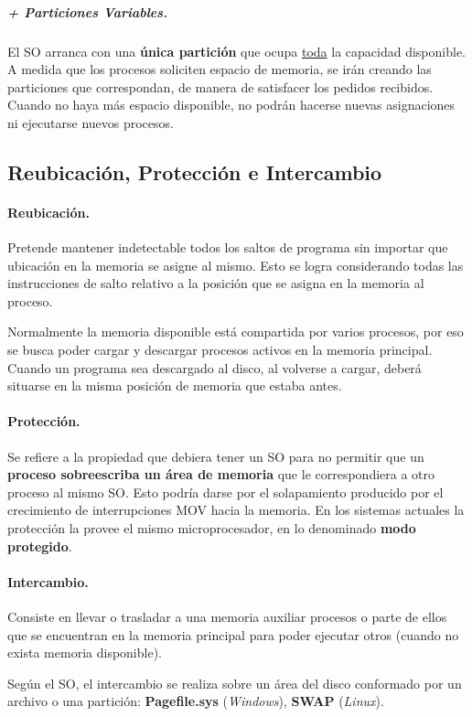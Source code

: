 \documentclass[10pt,a4paper]{article}
\begin{document}
\subparagraph{+ Particiones Variables.} El SO arranca con una \textbf{única partición} que ocupa \underline{toda} la capacidad disponible. A medida que los procesos soliciten espacio de memoria, se irán creando las particiones que correspondan, de manera de satisfacer los pedidos recibidos. Cuando no haya más espacio disponible, no podrán hacerse nuevas asignaciones ni ejecutarse nuevos procesos.

\subsection{Reubicación, Protección e Intercambio}

\paragraph{Reubicación.} Pretende mantener indetectable todos los saltos de programa sin importar que ubicación en la memoria se asigne al mismo. Esto se logra considerando todas las instrucciones de salto relativo a la posición que se asigna en la memoria al proceso.

Normalmente la memoria disponible está compartida por varios procesos, por eso se busca poder cargar y descargar procesos activos en la memoria principal. Cuando un programa sea descargado al disco, al volverse a cargar, deberá situarse en la misma posición de memoria que estaba antes.

\paragraph{Protección.} Se refiere a la propiedad que debiera tener un SO para no permitir que un \textbf{proceso sobreescriba un área de memoria} que le correspondiera a otro proceso al mismo SO. Esto podría darse por el solapamiento producido por el crecimiento de interrupciones MOV hacia la memoria. En los sistemas actuales la protección la provee el mismo microprocesador, en lo denominado \textbf{modo protegido}.

\paragraph{Intercambio.} Consiste en llevar o trasladar a una memoria auxiliar procesos o parte de ellos que se encuentran en la memoria principal para poder ejecutar otros (cuando no exista memoria disponible).

Según el SO, el intercambio se realiza sobre un área del disco conformado por un archivo o una partición: \textbf{Pagefile.sys} (\textit{Windows}), \textbf{SWAP} (\textit{Linux}).
\end{document}
